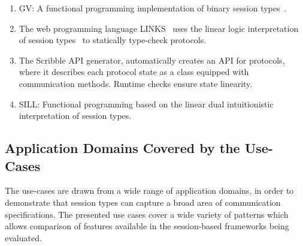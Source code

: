 \begin{enumerate}
	\item	GV:	A functional programming implementation of binary session types~\cite{DBLP:journals/jfp/Wadler14}.

	\item	The web programming language LINKS~\cite{citation_needed}
			uses the linear logic interpretation of session types~\cite{DBLP:journals/jfp/Wadler14}
			to statically type-check protocols.

	\item	The Scribble API generator, automatically creates an API for protocols,
			where it describes each protocol state as a class equipped with
			communication methods. Runtime checks ensure state linearity.

	\item	SILL:		Functional programming based on the linear dual intuitionistic interpretation of session types. 


\end{enumerate}

\subsection{Application Domains Covered by the Use-Cases}

The use-cases are drawn from a wide range of
application domains, in order to demonstrate that
session types can capture
a broad area of communication specifications.
The presented use cases cover a wide variety of patterns which allows comparison of features available in the session-based frameworks being evaluated. 


\newcommand{\myparagraph}[1]{\paragraph{\noindent\textit{\bf #1\ }}}


